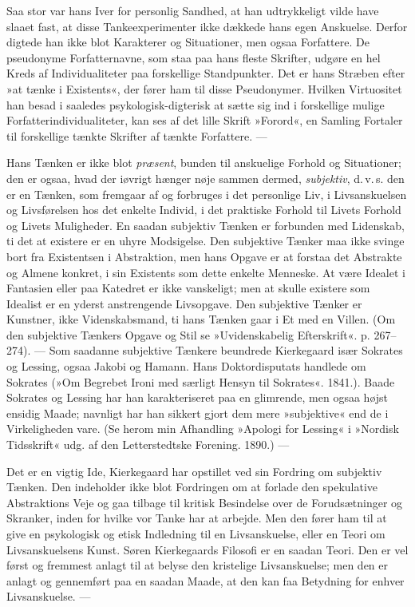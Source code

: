 \documentclass[12pt,a4paper,openany]{book}
\newcommand{\opage}[1]{\marginnote{\footnotesize\textit{[#1]}}}
\begin{document}
Saa stor var hans Iver for personlig Sandhed, at
han udtrykkeligt vilde have slaaet fast, at disse Tankeexperimenter
ikke dækkede hans egen Anskuelse. Derfor
digtede han ikke blot Karakterer og Situationer, men
ogsaa Forfattere. De pseudonyme Forfatternavne, som
staa paa hans fleste Skrifter, udgøre en hel Kreds af
Individualiteter paa forskellige Standpunkter. Det er
hans Stræben efter »at tænke i Existents«, der fører ham
til disse Pseudonymer. Hvilken Virtuositet han besad i
\opage{52}saaledes psykologisk-digterisk at sætte sig ind i forskellige
mulige Forfatterindividualiteter, kan ses af det lille
Skrift »Forord«, en Samling Fortaler til forskellige
tænkte Skrifter af tænkte Forfattere. ---

Hans Tænken er ikke blot \textit{præsent}, bunden til anskuelige
Forhold og Situationer; den er ogsaa, hvad der
iøvrigt hænger nøje sammen dermed, \textit{subjektiv}, d.\,v.\,s. den
er en Tænken, som fremgaar af og forbruges i det personlige
Liv, i Livsanskuelsen og Livsførelsen hos det enkelte
Individ, i det praktiske Forhold til Livets Forhold
og Livets Muligheder. En saadan subjektiv Tænken er
forbunden med Lidenskab, ti det at existere er en uhyre
Modsigelse. Den subjektive Tænker maa ikke svinge
bort fra Existentsen i Abstraktion, men hans Opgave er
at forstaa det Abstrakte og Almene konkret, i sin Existents
som dette enkelte Menneske. At være Idealet i
Fantasien eller paa Katedret er ikke vanskeligt; men at
skulle existere som Idealist er en yderst anstrengende
Livsopgave. Den subjektive Tænker er Kunstner, ikke
Videnskabsmand, ti hans Tænken gaar i Et med en
Villen. (Om den subjektive Tænkers Opgave og Stil se
»Uvidenskabelig Efterskrift«. p. 267--274). --- Som saadanne
subjektive Tænkere beundrede Kierkegaard især
Sokrates og Lessing, ogsaa Jakobi og Hamann. Hans
Doktordisputats handlede om Sokrates (»Om Begrebet
Ironi med særligt Hensyn til Sokrates«. 1841.). Baade
Sokrates og Lessing har han karakteriseret paa en glimrende,
men ogsaa højst ensidig Maade; navnligt har han
sikkert gjort dem mere »subjektive« end de i Virkeligheden
vare. (Se herom min Afhandling »Apologi for
Lessing« i »Nordisk Tidsskrift« udg. af den Letterstedtske
Forening. 1890.) ---

Det er en vigtig Ide, Kierkegaard har opstillet ved
sin Fordring om subjektiv Tænken. Den indeholder ikke
\opage{53}blot Fordringen om at forlade den spekulative Abstraktions
Veje og gaa tilbage til kritisk Besindelse over de
Forudsætninger og Skranker, inden for hvilke vor Tanke
har at arbejde. Men den fører ham til at give en psykologisk
og etisk Indledning til en Livsanskuelse, eller en
Teori om Livsanskuelsens Kunst. Søren Kierkegaards
Filosofi er en saadan Teori. Den er vel først og fremmest
anlagt til at belyse den kristelige Livsanskuelse;
men den er anlagt og gennemført paa en saadan Maade,
at den kan faa Betydning for enhver Livsanskuelse. ---
\end{document}
